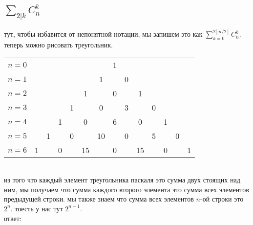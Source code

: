 \documentclass{article}
\newcommand{\ds}{\displaystyle}
\newcommand{\Cnk}[2]{C_{#1}^{#2}}
\renewcommand{\l}{\left}
\renewcommand{\r}{\right}
\begin{document}
  \subsection{$\ds \sum_{2|k}\Cnk{n}{k}$}
  тут, чтобы избавится от непонятной нотации, мы запишем это как $\ds \sum_{k=0}^{2\l\lfloor n/2 \r\rfloor}\Cnk{n}{k}$.
  теперь можно рисовать треугольник. \\
  \setlength\tabcolsep{0pt}
  \begin{tabular}{lccccccccccccc}
    $n=0$\hspace{12pt} &\hphantom{10}&\hphantom{10}&\hphantom{10}&\hphantom{10}&\hphantom{10}&\hphantom{10}&1&\hphantom{10}&\hphantom{10}&\hphantom{10}&\hphantom{10}&\hphantom{10}&\hphantom{10} \\
    $n=1$\hspace{12pt} &&&&&&1&\hphantom{10}&0&&&&& \\
    $n=2$\hspace{12pt} &&&&&1&&0&&1&&&& \\
    $n=3$\hspace{12pt} &&&&1&&0&&3&&0&&& \\
    $n=4$\hspace{12pt} &&&1&&0&&6&&0&&1&& \\
    $n=5$\hspace{12pt} &&1&&0&&10&&0&&5&&0& \\
    $n=6$\hspace{12pt} &1&&0&&15&&0&&15&&0&&1 \\
  \end{tabular}
  \setlength\tabcolsep{6pt} \\
  из того что каждый элемент треугольника паскаля это сумма двух стоящих над ним,
  мы получаем что сумма каждого второго элемента это сумма всех элементов предыдущей строки.
  мы также знаем что сумма всех элементов $n$-ой строки это $2^n$.
  тоесть у нас тут $2^{n-1}$. \\
  ответ: 
\end{document}
